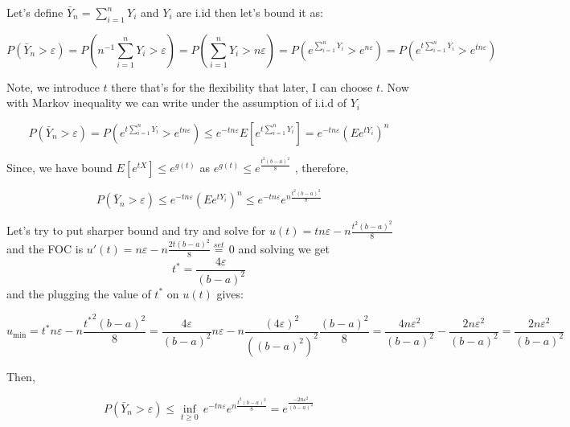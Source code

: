 \documentclass[
]{article}
\begin{document}
Let's define \({{\bar{Y}}_{n}}=\sum\limits_{i=1}^{n}{{{Y}_{i}}}\) and
\({{Y}_{i}}\) are i.id then let's bound it as:

\[P\left( {{{\bar{Y}}}_{n}}>\varepsilon  \right)=P\left( {{n}^{-1}}\sum\limits_{i=1}^{n}{{{Y}_{i}}}>\varepsilon  \right)=P\left( \sum\limits_{i=1}^{n}{{{Y}_{i}}}>n\varepsilon  \right)=P\left( {{e}^{\sum\limits_{i=1}^{n}{{{Y}_{i}}}}}>{{e}^{n\varepsilon }} \right)=P\left( {{e}^{t\sum\limits_{i=1}^{n}{{{Y}_{i}}}}}>{{e}^{tn\varepsilon }} \right)\]

Note, we introduce \(t\) there that's for the flexibility that later, I
can choose \(t\). Now with Markov inequality we can write under the
assumption of i.i.d of \({{Y}_{i}}\)

\[P\left( {{{\bar{Y}}}_{n}}>\varepsilon  \right)=P\left( {{e}^{t\sum\limits_{i=1}^{n}{{{Y}_{i}}}}}>{{e}^{tn\varepsilon }} \right)\le {{e}^{-tn\varepsilon }}E\left[ {{e}^{t\sum\limits_{i=1}^{n}{{{Y}_{i}}}}} \right]={{e}^{-tn\varepsilon }}{{\left( E{{e}^{t{{Y}_{i}}}} \right)}^{n}}\]

Since, we have bound
\(E\left[ {{e}^{tX}} \right]\le {{e}^{g\left( t \right)}}\) as
\({{e}^{g\left( t \right)}}\le {{e}^{\frac{{{t}^{2}}{{\left( b-a \right)}^{2}}}{8}}}\)
, therefore,

\[P\left( {{{\bar{Y}}}_{n}}>\varepsilon  \right)\le {{e}^{-tn\varepsilon }}{{\left( E{{e}^{t{{Y}_{i}}}} \right)}^{n}}\le {{e}^{-tn\varepsilon }}{{e}^{n\frac{{{t}^{2}}{{\left( b-a \right)}^{2}}}{8}}}\]

Let's try to put sharper bound and try and solve for
\(u\left( t \right)=tn\varepsilon -n\frac{{{t}^{2}}{{\left( b-a \right)}^{2}}}{8}\)
and the FOC is
\({u}'\left( t \right)=n\varepsilon -n\frac{2t{{\left( b-a \right)}^{2}}}{8}\overset{set}{\mathop{=}}\,0\)
and solving we get
\[{{t}^{*}}=\frac{4\varepsilon }{{{\left( b-a \right)}^{2}}}\] and the
plugging the value of \({{t}^{*}}\) on \(u\left( t \right)\) gives:

\[{{u}_{\min }}={{t}^{*}}n\varepsilon -n\frac{{{t}^{*}}^{2}{{\left( b-a \right)}^{2}}}{8}=\frac{4\varepsilon }{{{\left( b-a \right)}^{2}}}n\varepsilon -n\frac{{{\left( 4\varepsilon  \right)}^{2}}}{{{\left( {{\left( b-a \right)}^{2}} \right)}^{2}}}\frac{{{\left( b-a \right)}^{2}}}{8}=\frac{4n{{\varepsilon }^{2}}}{{{\left( b-a \right)}^{2}}}-\frac{2n{{\varepsilon }^{2}}}{{{\left( b-a \right)}^{2}}}=\frac{2n{{\varepsilon }^{2}}}{{{\left( b-a \right)}^{2}}}\]

Then,

\[P\left( {{{\bar{Y}}}_{n}}>\varepsilon  \right)\le \underset{t\ge 0}{\mathop{\inf }}\,{{e}^{-tn\varepsilon }}{{e}^{n\frac{{{t}^{2}}{{\left( b-a \right)}^{2}}}{8}}}={{e}^{\frac{-2n{{\varepsilon }^{2}}}{{{\left( b-a \right)}^{2}}}}}\]
\end{document}
